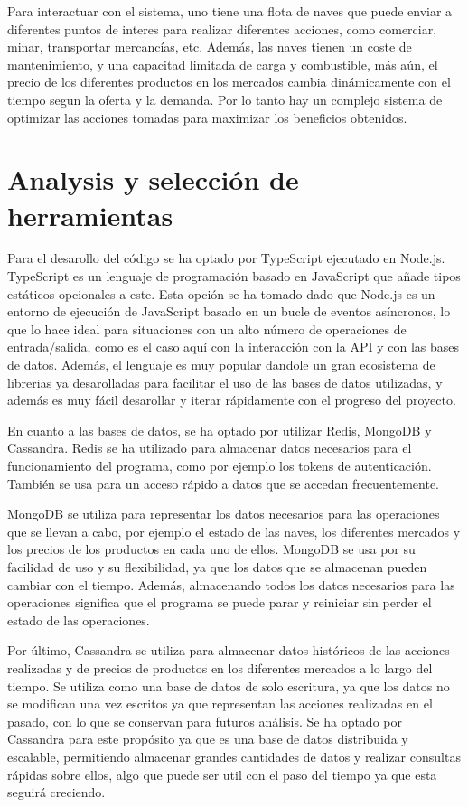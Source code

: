 \documentclass[spanish]{article}
\begin{document}
Para interactuar con el sistema, uno tiene una flota de naves
que puede enviar a diferentes puntos de interes para realizar
diferentes acciones, como comerciar, minar, transportar mercancías, etc.
Además, las naves tienen un coste de mantenimiento,
y una capacitad limitada de carga y combustible,
más aún, el precio de los diferentes productos en los mercados
cambia dinámicamente con el tiempo segun la oferta y la demanda.
Por lo tanto hay un complejo sistema de optimizar
las acciones tomadas para maximizar los beneficios obtenidos.

\section{Analysis y selección de herramientas}

Para el desarollo del código se ha optado por TypeScript ejecutado en Node.js.
TypeScript es un lenguaje de programación basado en JavaScript que añade tipos estáticos opcionales a este.
Esta opción se ha tomado dado que Node.js es un entorno de ejecución de JavaScript basado en un
bucle de eventos asíncronos, lo que lo hace ideal para situaciones con un alto número de operaciones de entrada/salida, como es el caso aquí
con la interacción con la API y con las bases de datos.
Además, el lenguaje es muy popular dandole un gran ecosistema de librerias ya desarolladas para facilitar el uso de las bases de datos utilizadas,
y además es muy fácil desarollar y iterar rápidamente con el progreso del proyecto.

En cuanto a las bases de datos, se ha optado por utilizar Redis, MongoDB y Cassandra.
Redis se ha utilizado para almacenar datos necesarios para el funcionamiento del programa, como por ejemplo los tokens de autenticación.
También se usa para un acceso rápido a datos que se accedan frecuentemente.

MongoDB se utiliza para representar los datos necesarios para las operaciones que se llevan a cabo, por ejemplo el estado de las naves,
los diferentes mercados y los precios de los productos en cada uno de ellos.
MongoDB se usa por su facilidad de uso y su flexibilidad, ya que los datos que se almacenan pueden cambiar con el tiempo.
Además, almacenando todos los datos necesarios para las operaciones significa que el programa
se puede parar y reiniciar sin perder el estado de las operaciones.

Por último, Cassandra se utiliza para almacenar datos históricos de las acciones realizadas y
de precios de productos en los diferentes mercados a lo largo del tiempo.
Se utiliza como una base de datos de solo escritura, ya que los datos no se modifican una vez escritos
ya que representan las acciones realizadas en el pasado, con lo que se conservan para futuros análisis.
Se ha optado por Cassandra para este propósito ya que es una base de datos distribuida y escalable,
permitiendo almacenar grandes cantidades de datos y realizar consultas rápidas sobre ellos,
algo que puede ser util con el paso del tiempo ya que esta seguirá creciendo.
\end{document}
